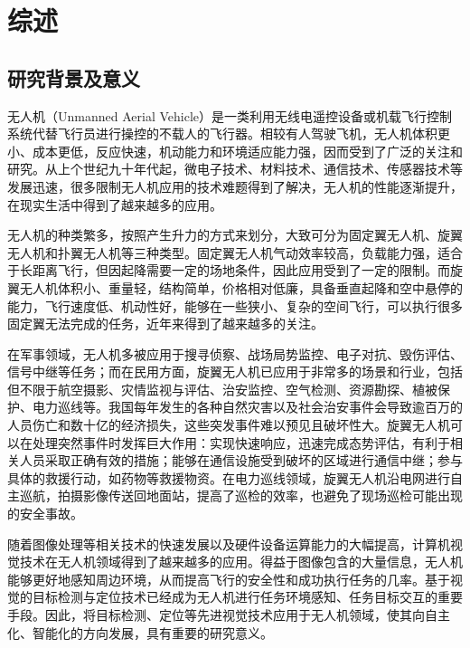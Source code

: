 
\chapter{综述}

\section{研究背景及意义}

无人机（Unmanned Aerial Vehicle）是一类利用无线电遥控设备或机载飞行控制系统代替飞行员进行操控的不载人的飞行器。相较有人驾驶飞机，无人机体积更小、成本更低，反应快速，机动能力和环境适应能力强，因而受到了广泛的关注和研究。从上个世纪九十年代起，微电子技术、材料技术、通信技术、传感器技术等发展迅速，很多限制无人机应用的技术难题得到了解决，无人机的性能逐渐提升，在现实生活中得到了越来越多的应用。

无人机的种类繁多，按照产生升力的方式来划分，大致可分为固定翼无人机、旋翼无人机和扑翼无人机等三种类型。固定翼无人机气动效率较高，负载能力强，适合于长距离飞行，但因起降需要一定的场地条件，因此应用受到了一定的限制。而旋翼无人机体积小、重量轻，结构简单，价格相对低廉，具备垂直起降和空中悬停的能力，飞行速度低、机动性好，能够在一些狭小、复杂的空间飞行，可以执行很多固定翼无法完成的任务，近年来得到了越来越多的关注。

在军事领域，无人机多被应用于搜寻侦察、战场局势监控、电子对抗、毁伤评估、信号中继等任务\cite{刘天奇2015}\cite{朱玮2014}；而在民用方面，旋翼无人机已应用于非常多的场景和行业，包括但不限于航空摄影、灾情监视与评估、治安监控、空气检测、资源勘探、植被保护、电力巡线等。我国每年发生的各种自然灾害以及社会治安事件会导致逾百万的人员伤亡和数十亿的经济损失\cite{陈丽娟2013}，这些突发事件难以预见且破坏性大。旋翼无人机可以在处理突然事件时发挥巨大作用：实现快速响应，迅速完成态势评估，有利于相关人员采取正确有效的措施；能够在通信设施受到破坏的区域进行通信中继；参与具体的救援行动，如药物等救援物资。在电力巡线领域，旋翼无人机沿电网进行自主巡航，拍摄影像传送回地面站，提高了巡检的效率，也避免了现场巡检可能出现的安全事故\cite{周士超2016}。



随着图像处理等相关技术的快速发展以及硬件设备运算能力的大幅提高，计算机视觉技术在无人机领域得到了越来越多的应用\cite{袁峻2017}。得益于图像包含的大量信息，无人机能够更好地感知周边环境，从而提高飞行的安全性和成功执行任务的几率。基于视觉的目标检测与定位技术已经成为无人机进行任务环境感知、任务目标交互的重要手段。因此，将目标检测、定位等先进视觉技术应用于无人机领域，使其向自主化、智能化的方向发展，具有重要的研究意义。

